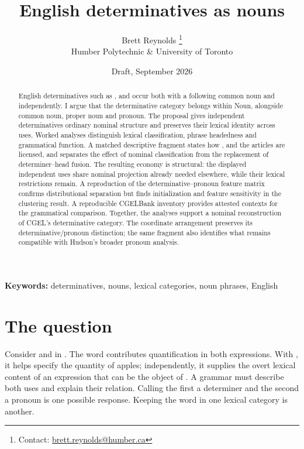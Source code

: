 \documentclass[12pt]{article}
\title{English determinatives as nouns}
\author{Brett Reynolds \orcidlink{0000-0003-0073-7195}%
\thanks{Contact: \href{mailto:brett.reynolds@humber.ca}{brett.reynolds@humber.ca}}\\
Humber Polytechnic \& University of Toronto}
\date{Draft, September 2026}
\begin{document}
\maketitle

\begin{abstract}
English determinatives such as ,  and  occur both with a following common noun and independently. I argue that the determinative category belongs within Noun, alongside common noun, proper noun and pronoun. The proposal gives independent determinatives ordinary nominal structure and preserves their lexical identity across uses. Worked analyses distinguish lexical classification, phrase headedness and grammatical function. A matched descriptive fragment states how ,  and the articles are licensed, and separates the effect of nominal classification from the replacement of determiner--head fusion. The resulting economy is structural: the displayed independent uses share nominal projection already needed elsewhere, while their lexical restrictions remain. A reproduction of the determinative--pronoun feature matrix confirms distributional separation but finds initialization and feature sensitivity in the clustering result. A reproducible CGELBank inventory provides attested contexts for the grammatical comparison. Together, the analyses support a nominal reconstruction of CGEL's determinative category. The coordinate arrangement preserves its determinative/pronoun distinction; the same fragment also identifies what remains compatible with Hudson's broader pronoun analysis.
\end{abstract}

\noindent\textbf{Keywords:} determinatives, nouns, lexical categories, noun phrases, English

\section{The question}\label{sec:intro}

Consider  and  in . The word  contributes quantification in both expressions. With , it helps specify the quantity of apples; independently, it supplies the overt lexical content of an expression that can be the object of . A grammar must describe both uses and explain their relation. Calling the first a determiner and the second a pronoun is one possible response. Keeping the word in one lexical category is another.
\end{document}
